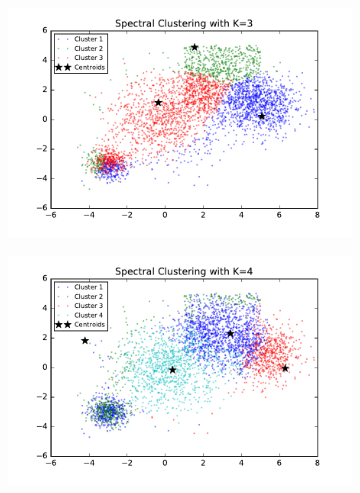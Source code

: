\begin{figure}[htb]
        \centering
        \begin{subfigure}[b]{0.475\textwidth}
            \centering
            \includegraphics[width=\textwidth]{./figures/bigClustering_spectral_3.pdf}
        \end{subfigure}
        \hfill
        \begin{subfigure}[b]{0.475\textwidth}  
            \centering 
            \includegraphics[width=\textwidth]{./figures/bigClustering_spectral_4.pdf}
        \end{subfigure}
        \begin{subfigure}[b]{0.475\textwidth}  
            \centering 

\end{subfigure}
\end{figure}

